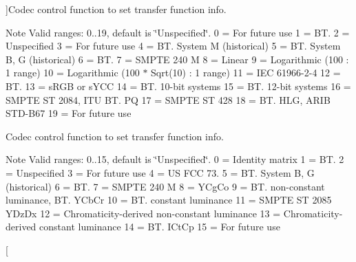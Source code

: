 \begin{Desc}
\begin{description}
{}]Codec control function to set transfer function info. \begin{DoxyNote}{Note}
Valid ranges\+: 0..19, default is \char`\"{}\+Unspecified\char`\"{}. 0 = For future use 1 = B\+T. 2 = Unspecified 3 = For future use 4 = B\+T. System M (historical) 5 = B\+T. System B, G (historical) 6 = B\+T. 7 = S\+M\+P\+TE 240 M 8 = Linear 9 = Logarithmic (100 \+: 1 range) 10 = Logarithmic (100 $\ast$ Sqrt(10) \+: 1 range) 11 = I\+EC 61966-\/2-\/4 12 = B\+T. 13 = s\+R\+GB or s\+Y\+CC 14 = B\+T. 10-\/bit systems 15 = B\+T. 12-\/bit systems 16 = S\+M\+P\+TE ST 2084, I\+TU B\+T. PQ 17 = S\+M\+P\+TE ST 428 18 = B\+T. H\+LG, A\+R\+IB S\+T\+D-\/\+B67 19 = For future use 
\end{DoxyNote}
\item[{\em 
A\+V1\+E\+\_\+\+S\+E\+T\+\_\+\+M\+A\+T\+R\+I\+X\+\_\+\+C\+O\+E\+F\+F\+I\+C\+I\+E\+N\+TS\hypertarget{group__aom__encoder_ggae78dde67a6d78f332e9bdba0dde42db5a0111ed659d2cd11827ac5cd1f3d774b0}{}\label{group__aom__encoder_ggae78dde67a6d78f332e9bdba0dde42db5a0111ed659d2cd11827ac5cd1f3d774b0}
}]Codec control function to set transfer function info. \begin{DoxyNote}{Note}
Valid ranges\+: 0..15, default is \char`\"{}\+Unspecified\char`\"{}. 0 = Identity matrix 1 = B\+T. 2 = Unspecified 3 = For future use 4 = US F\+CC 73. 5 = B\+T. System B, G (historical) 6 = B\+T. 7 = S\+M\+P\+TE 240 M 8 = Y\+Cg\+Co 9 = B\+T. non-\/constant luminance, B\+T. Y\+Cb\+Cr 10 = B\+T. constant luminance 11 = S\+M\+P\+TE ST 2085 Y\+Dz\+Dx 12 = Chromaticity-\/derived non-\/constant luminance 13 = Chromaticity-\/derived constant luminance 14 = B\+T. I\+Ct\+Cp 15 = For future use 
\end{DoxyNote}
\item[{\em 
}
\end{description}
\end{Desc}
